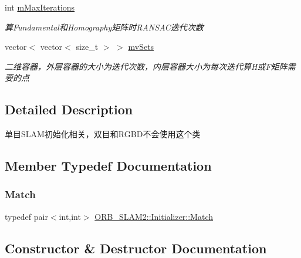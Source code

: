 \begin{DoxyCompactItemize}
int \mbox{\hyperlink{class_o_r_b___s_l_a_m2_1_1_initializer_a8d9647dedc212bd1fe05084ec7875a05}{m\+Max\+Iterations}}
\begin{DoxyCompactList}\small\item\em 算\+Fundamental和\+Homography矩阵时\+R\+A\+N\+S\+A\+C迭代次数 \end{DoxyCompactList}\item 
vector$<$ vector$<$ size\+\_\+t $>$ $>$ \mbox{\hyperlink{class_o_r_b___s_l_a_m2_1_1_initializer_a572144f600b28828d4772b0470206afe}{mv\+Sets}}
\begin{DoxyCompactList}\small\item\em 二维容器，外层容器的大小为迭代次数，内层容器大小为每次迭代算\+H或\+F矩阵需要的点 \end{DoxyCompactList}\end{DoxyCompactItemize}


\subsection{Detailed Description}
单目\+S\+L\+A\+M初始化相关，双目和\+R\+G\+B\+D不会使用这个类 

\subsection{Member Typedef Documentation}
\mbox{\label{class_o_r_b___s_l_a_m2_1_1_initializer_ad0bf21297bc6271e7d014ce41d6ff7d4}} 
\subsubsection{\texorpdfstring{Match}{Match}}
{\footnotesize\ttfamily typedef pair$<$int,int$>$ \mbox{\hyperlink{class_o_r_b___s_l_a_m2_1_1_initializer_ad0bf21297bc6271e7d014ce41d6ff7d4}{O\+R\+B\+\_\+\+S\+L\+A\+M2\+::\+Initializer\+::\+Match}}\hspace{0.3cm}{\ttfamily [private]}}



\subsection{Constructor \& Destructor Documentation}
\mbox{\label{class_o_r_b___s_l_a_m2_1_1_initializer_ac492345a970665cd8a1b1d8cf41d44af}} 
